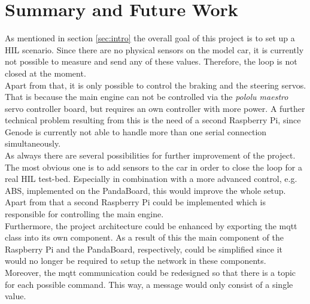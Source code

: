 \section{Summary and Future Work}
As mentioned in section \ref{sec:intro} the overall goal of this project is to set up a HIL scenario. Since there are no physical sensors on the model car, it is currently not possible to measure and send any of these values. Therefore, the loop is not closed at the moment. \\

Apart from that, it is only possible to control the braking and the steering servos. That is because the main engine can not be controlled via the \textit{pololu maestro} servo controller board, but requires an own controller with more power. A further technical problem resulting from this is the need of a second Raspberry Pi, since Genode is currently not able to handle more than one serial connection simultaneously. \\

As always there are several possibilities for further improvement of the project. The most obvious one is to add sensors to the car in order to close the loop for a real HIL test-bed. Especially in combination with a more advanced control, e.g. ABS, implemented on the PandaBoard, this would improve the whole setup. \\

Apart from that a second Raspberry Pi could be implemented which is responsible for controlling the main engine. \\

Furthermore, the project architecture could be enhanced by exporting the mqtt class into its own component. As a result of this the main component of the Raspberry Pi and the PandaBoard, respectively, could be simplified since it would no longer be required to setup the network in these components. \\

Moreover, the mqtt communication could be redesigned so that there is a topic for each possible command. This way, a message would only consist of a single value.
